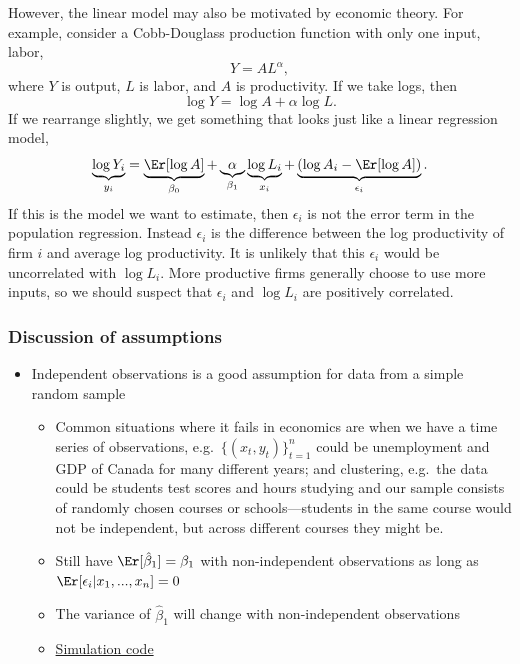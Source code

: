 However, the linear model may also be motivated by economic
theory. For example, consider a Cobb-Douglass production function with
only one input, labor,
\[ Y = A L^\alpha, \] 
where $Y$ is output, $L$ is labor, and $A$ is productivity. If we take logs, then
\[ \log Y = \log A + \alpha \log L. \]
If we rearrange slightly, we get something that looks just like a
linear regression model, 
\[ \underbrace{\log Y_i}_{y_i} = \underbrace{\Er[\log A]}_{\beta_0}
+ \underbrace{\alpha}_{\beta_1} \underbrace{\log L_i}_{x_i} +
\underbrace{(\log{A}_i - \Er[\log A])}_{\epsilon_i}. \]
If this is the model we want to estimate, then $\epsilon_i$ is not the
error term in the population regression. Instead $\epsilon_i$ is the
difference between the log productivity of firm $i$ and average log
productivity. It is unlikely that this $\epsilon_i$ would be
uncorrelated with $\log L_i$. More productive firms generally choose
to use more inputs, so we should suspect that $\epsilon_i$ and $\log
L_i$ are positively correlated.

\begin{frame}[allowframebreaks]
  \frametitle{Discussion of assumptions}
  \begin{itemize}
  \item[SLR.2] Independent observations is a good assumption for data
    from a simple random sample
    \begin{itemize}
    \item Common situations where it fails in
      economics are when we have a time series of observations,
      e.g.\ $\{(x_t,y_t)\}_{t=1}^n$ could be unemployment and GDP of
      Canada for many different years; and clustering, e.g.\ the data
      could be students test scores and hours studying and our sample
      consists of randomly chosen courses or schools---students in the
      same course would not be independent, but across different courses
      they might be.
    \item Still have $\Er[\hat{\beta}_1] = \beta_1$ with
      non-independent observations as long as $\Er[\epsilon_i | x_1, ..., x_n] = 0$
    \item The variance of $\hat{\beta}_1$ will change with
      non-independent observations
    \item
      \href{https://bitbucket.org/paulschrimpf/econ326/src/master/notes/03/dependent.R?at=master}
      {Simulation code}
    \end{itemize}
  \end{itemize}
\end{frame}


